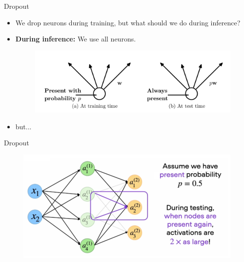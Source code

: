 \documentclass[10pt]{beamer}
\theoremstyle{remark}
\theoremstyle{definition}
\begin{document}
\begin{frame}{Dropout}
\begin{itemize}
    \item We drop neurons during training, but what should we do during inference?
    \item \textbf{During inference:} We use all neurons. 

    \begin{figure}
    \centering
    \includegraphics[width=1.0\textwidth,height=0.8\textheight,keepaspectratio]{./images/dropout_2.png}
    \end{figure}

\item but... 

    
\end{itemize}
\end{frame}

\begin{frame}{Dropout}
\begin{figure}
    \centering
    \includegraphics[width=1.0\textwidth,height=1.0\textheight,keepaspectratio]{./images/dropout_light.png}
    \end{figure}
\end{frame}
\end{document}
